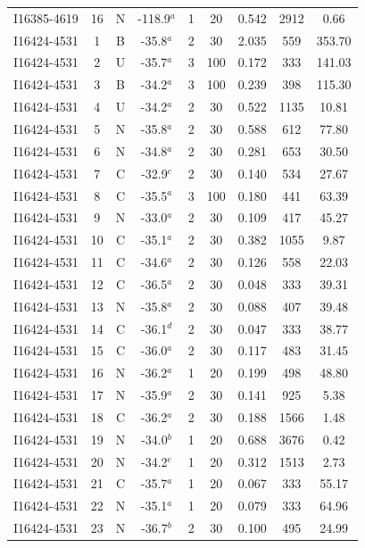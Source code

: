 \begin{table}
\begin{tabular}{ccccccccc}
I16385-4619 & 16 & N & -118.9$^{a}$ & 1 & 20 & 0.542 & 2912 & 0.66 \\
I16424-4531 & 1 & B & -35.8$^{a}$ & 2 & 30 & 2.035 & 559 & 353.70 \\
I16424-4531 & 2 & U & -35.7$^{a}$ & 3 & 100 & 0.172 & 333 & 141.03 \\
I16424-4531 & 3 & B & -34.2$^{a}$ & 3 & 100 & 0.239 & 398 & 115.30 \\
I16424-4531 & 4 & U & -34.2$^{a}$ & 2 & 30 & 0.522 & 1135 & 10.81 \\
I16424-4531 & 5 & N & -35.8$^{a}$ & 2 & 30 & 0.588 & 612 & 77.80 \\
I16424-4531 & 6 & N & -34.8$^{a}$ & 2 & 30 & 0.281 & 653 & 30.50 \\
I16424-4531 & 7 & C & -32.9$^{c}$ & 2 & 30 & 0.140 & 534 & 27.67 \\
I16424-4531 & 8 & C & -35.5$^{a}$ & 3 & 100 & 0.180 & 441 & 63.39 \\
I16424-4531 & 9 & N & -33.0$^{a}$ & 2 & 30 & 0.109 & 417 & 45.27 \\
I16424-4531 & 10 & C & -35.1$^{a}$ & 2 & 30 & 0.382 & 1055 & 9.87 \\
I16424-4531 & 11 & C & -34.6$^{a}$ & 2 & 30 & 0.126 & 558 & 22.03 \\
I16424-4531 & 12 & C & -36.5$^{a}$ & 2 & 30 & 0.048 & 333 & 39.31 \\
I16424-4531 & 13 & N & -35.8$^{a}$ & 2 & 30 & 0.088 & 407 & 39.48 \\
I16424-4531 & 14 & C & -36.1$^{d}$ & 2 & 30 & 0.047 & 333 & 38.77 \\
I16424-4531 & 15 & C & -36.0$^{a}$ & 2 & 30 & 0.117 & 483 & 31.45 \\
I16424-4531 & 16 & N & -36.2$^{a}$ & 1 & 20 & 0.199 & 498 & 48.80 \\
I16424-4531 & 17 & N & -35.9$^{a}$ & 2 & 30 & 0.141 & 925 & 5.38 \\
I16424-4531 & 18 & C & -36.2$^{a}$ & 2 & 30 & 0.188 & 1566 & 1.48 \\
I16424-4531 & 19 & N & -34.0$^{b}$ & 1 & 20 & 0.688 & 3676 & 0.42 \\
I16424-4531 & 20 & N & -34.2$^{e}$ & 1 & 20 & 0.312 & 1513 & 2.73 \\
I16424-4531 & 21 & C & -35.7$^{a}$ & 1 & 20 & 0.067 & 333 & 55.17 \\
I16424-4531 & 22 & N & -35.1$^{a}$ & 1 & 20 & 0.079 & 333 & 64.96 \\
I16424-4531 & 23 & N & -36.7$^{b}$ & 2 & 30 & 0.100 & 495 & 24.99 \\

\end{tabular}
\end{table}
